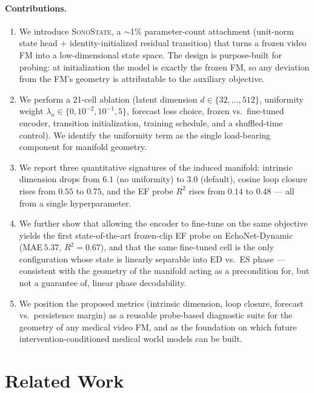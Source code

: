 \documentclass[runningheads]{llncs}
\newcommand{\sonostate}{\textsc{SonoState}\xspace}
\begin{document}
\paragraph{Contributions.}
\begin{enumerate}
\item We introduce \sonostate, a $\sim$1\% parameter-count attachment
(unit-norm state head $+$ identity-initialized residual transition) that
turns a frozen video FM into a low-dimensional state space. The design
is purpose-built for probing: at initialization the model is exactly the
frozen FM, so any deviation from the FM's geometry is attributable to
the auxiliary objective.
\item We perform a 21-cell ablation (latent dimension $d\!\in\!\{32,\ldots,512\}$,
uniformity weight $\lambda_u\!\in\!\{0,10^{-2},10^{-1},5\}$, forecast loss
choice, frozen vs.\ fine-tuned encoder, transition initialization, training
schedule, and a shuffled-time control). We identify the uniformity term as
the single load-bearing component for manifold geometry.
\item We report three quantitative signatures of the induced manifold:
intrinsic dimension drops from $6.1$ (no uniformity) to $3.0$ (default),
cosine loop closure rises from $0.55$ to $0.75$, and the EF probe $R^2$
rises from $0.14$ to $0.48$ --- all from a single hyperparameter.
\item We further show that allowing the encoder to fine-tune on the same
objective yields the first state-of-the-art frozen-clip EF probe on
EchoNet-Dynamic (MAE\,$5.37$, $R^2{=}0.67$), and that the same fine-tuned
cell is the only configuration whose state is linearly separable into
ED vs.\ ES phase --- consistent with the geometry of the manifold acting
as a precondition for, but not a guarantee of, linear phase decodability.
\item We position the proposed metrics (intrinsic dimension, loop closure,
forecast vs.\ persistence margin) as a reusable probe-based diagnostic
suite for the geometry of any medical video FM, and as the foundation on
which future intervention-conditioned medical world models can be built.
\end{enumerate}

\section{Related Work}\label{sec:related}
\end{document}

